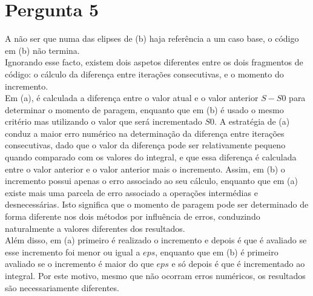 {\section{Pergunta 5}
A não ser que numa das elipses de (b) haja referência a um caso base, o código em (b) não termina.\\
Ignorando esse facto, existem dois aspetos diferentes entre os dois fragmentos de código: o cálculo da diferença entre iterações consecutivas, e o momento do incremento.\\
Em (a), é calculada a diferença entre o valor atual e o valor anterior $S-S0$ para determinar o momento de paragem, enquanto que em (b) é usado o mesmo critério mas utilizando o valor que será incrementado $S0$. A estratégia de (a) conduz a maior erro numérico na determinação da diferença entre iterações consecutivas, dado que o valor da diferença pode ser relativamente pequeno quando comparado com os valores do integral, e que essa diferença é calculada entre o valor anterior e o valor anterior mais o incremento. Assim, em (b) o incremento possui apenas o erro associado ao seu cálculo, enquanto que em (a) existe mais uma parcela de erro associado a operações intermédias e desnecessárias. Isto significa que o momento de paragem pode ser determinado de forma diferente nos dois métodos por influência de erros, conduzindo naturalmente a valores diferentes dos resultados.\\
Além disso, em (a) primeiro é realizado o incremento e depois é que é avaliado se esse incremento foi menor ou igual a $eps$, enquanto que em (b) é primeiro avaliado se o incremento é maior do que $eps$ e só depois é que é incrementado ao integral. Por este motivo, mesmo que não ocorram erros numéricos, os resultados são necessariamente diferentes.
}